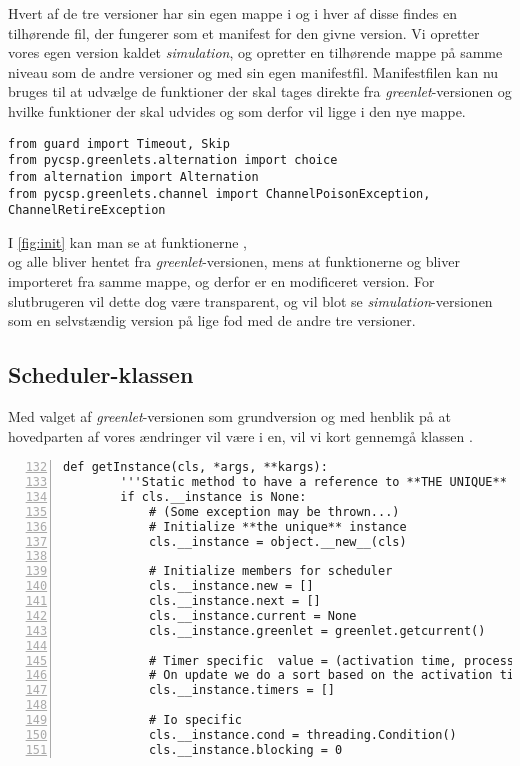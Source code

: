 Hvert af de tre versioner har sin egen mappe i \pycsp og i hver af disse findes en tilhørende  fil, der fungerer som et manifest for den givne version. Vi opretter vores egen version kaldet \emph{simulation}, og opretter en tilhørende mappe på samme niveau som de andre versioner og med sin egen manifestfil. Manifestfilen kan nu bruges til at udvælge de funktioner der skal tages direkte fra \emph{greenlet}-versionen og hvilke funktioner der skal udvides og som derfor vil ligge i den nye mappe.
\begin{lstlisting}[float=hbtp,label=fig:init,caption=Uddrag af \code{\_\_init\_\_.py} for simulationsversionen.]
from guard import Timeout, Skip
from pycsp.greenlets.alternation import choice
from alternation import Alternation
from pycsp.greenlets.channel import ChannelPoisonException, ChannelRetireException
\end{lstlisting}

I \cref{fig:init} kan man se at funktionerne , \\ og  alle bliver hentet fra \emph{greenlet}-versionen, mens at funktionerne  og  bliver importeret fra samme mappe, og derfor er en modificeret version. For slutbrugeren  vil dette dog være transparent, og vil blot se \emph{simulation}-versionen som en selvstændig version på lige fod med de andre tre versioner.

\subsection{Scheduler-klassen}
Med valget af \emph{greenlet}-versionen som grundversion og med henblik på at hovedparten af vores ændringer vil være i \sched en, vil vi kort gennemgå klassen .

\begin{lstlisting}[firstnumber=132,stepnumber=5,numbers=left, float, label=fig:scheduling, caption=Uddrag af Scheduler.py i \emph{greenlets}versionen.]
    def getInstance(cls, *args, **kargs):
        '''Static method to have a reference to **THE UNIQUE** instance'''
        if cls.__instance is None:
            # (Some exception may be thrown...)
            # Initialize **the unique** instance
            cls.__instance = object.__new__(cls)

            # Initialize members for scheduler
            cls.__instance.new = []
            cls.__instance.next = []
            cls.__instance.current = None
            cls.__instance.greenlet = greenlet.getcurrent()

            # Timer specific  value = (activation time, process)
            # On update we do a sort based on the activation time
            cls.__instance.timers = []

            # Io specific
            cls.__instance.cond = threading.Condition()
            cls.__instance.blocking = 0
\end{lstlisting}

